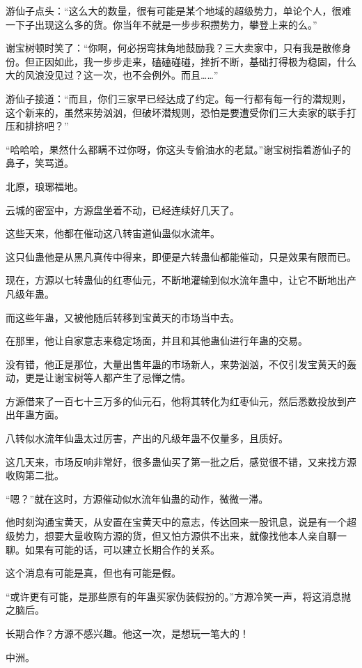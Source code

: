 \begin{this_body}
游仙子点头：“这么大的数量，很有可能是某个地域的超级势力，单论个人，很难一下子出现这么多的货。你当年不就是一步步积攒势力，攀登上来的么。”

谢宝树顿时笑了：“你啊，何必拐弯抹角地鼓励我？三大卖家中，只有我是散修身份。但正因如此，我一步步走来，磕磕碰碰，挫折不断，基础打得极为稳固，什么大的风浪没见过？这一次，也不会例外。而且……”

游仙子接道：“而且，你们三家早已经达成了约定。每一行都有每一行的潜规则，这个新来的，虽然来势汹汹，但破坏潜规则，恐怕是要遭受你们三大卖家的联手打压和排挤吧？”

“哈哈哈，果然什么都瞒不过你呀，你这头专偷油水的老鼠。”谢宝树指着游仙子的鼻子，笑骂道。

北原，琅琊福地。

云城的密室中，方源盘坐着不动，已经连续好几天了。

这些天来，他都在催动这八转宙道仙蛊似水流年。

这只仙蛊他是从黑凡真传中得来，即便是六转蛊仙都能催动，只是效果有限而已。

现在，方源以七转蛊仙的红枣仙元，不断地灌输到似水流年蛊中，让它不断地出产凡级年蛊。

而这些年蛊，又被他随后转移到宝黄天的市场当中去。

在那里，他让自家意志来稳定场面，并且和其他蛊仙进行年蛊的交易。

没有错，他正是那位，大量出售年蛊的市场新人，来势汹汹，不仅引发宝黄天的轰动，更是让谢宝树等人都产生了忌惮之情。

方源借来了一百七十三万多的仙元石，他将其转化为红枣仙元，然后悉数投放到产出年蛊方面。

八转似水流年仙蛊太过厉害，产出的凡级年蛊不仅量多，且质好。

这几天来，市场反响非常好，很多蛊仙买了第一批之后，感觉很不错，又来找方源收购第二批。

“嗯？”就在这时，方源催动似水流年仙蛊的动作，微微一滞。

他时刻沟通宝黄天，从安置在宝黄天中的意志，传达回来一股讯息，说是有一个超级势力，想要大量收购方源的货，但又怕方源供不出来，就像找他本人亲自聊一聊。如果有可能的话，可以建立长期合作的关系。

这个消息有可能是真，但也有可能是假。

“或许更有可能，是那些原有的年蛊买家伪装假扮的。”方源冷笑一声，将这消息抛之脑后。

长期合作？方源不感兴趣。他这一次，是想玩一笔大的！

中洲。


\end{this_body}
